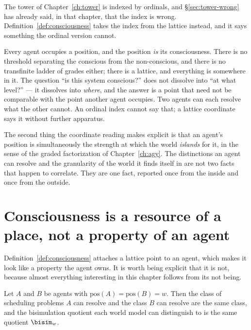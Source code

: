 \begin{remark}
\label{rmk:coordinate}
The tower of Chapter~\ref{ch:tower} is indexed by ordinals, and
\S\ref{sec:tower-wrong} has already said, in that chapter, that the index
is wrong.
Definition~\ref{def:consciousness} takes the index from the lattice
instead, and it says something the ordinal version cannot.

Every agent occupies a position, and the position \emph{is} its
consciousness.
There is no threshold separating the conscious from the non-conscious,
and there is no transfinite ladder of grades either; there is a lattice,
and everything is somewhere in it.
The question ``is this system conscious?'' does not dissolve into ``at
what level?'' --- it dissolves into \emph{where}, and the answer is a
point that need not be comparable with the point another agent occupies.
Two agents can each resolve what the other cannot.
An ordinal index cannot say that; a lattice coordinate says it without
further apparatus.

The second thing the coordinate reading makes explicit is that an agent's
position is simultaneously the strength at which the world \emph{islands}
for it, in the sense of the graded factorization of
Chapter~\ref{ch:agy}.
The distinctions an agent can resolve and the granularity of the world it
finds itself in are not two facts that happen to correlate.
They are one fact, reported once from the inside and once from the
outside.
\end{remark}

\section{Consciousness is a resource of a place, not a property of an agent}
\label{sec:shared}

Definition~\ref{def:consciousness} attaches a lattice point to an agent,
which makes it look like a property the agent owns.
It is worth being explicit that it is not, because almost everything
interesting in this chapter follows from its not being.

\begin{proposition}
\label{prop:shared}
Let $A$ and $B$ be agents with $\mathrm{pos}(A) = \mathrm{pos}(B) = w$.
Then the class of scheduling problems $A$ can resolve and the class $B$
can resolve are the same class, and the bisimulation quotient each
world model can distinguish to is the same quotient $\bisim_w$.
\end{proposition}

